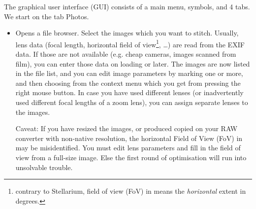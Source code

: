 The graphical user interface (GUI) consists of a main menu, symbols, and 4 tabs. We start on the tab Photos.
\begin{itemize}
\item {} Opens a file browser. Select the images which you
  want to stitch. Usually, lens data (focal length, horizontal field of view\footnote{%
    contrary to Stellarium, field of view (FoV) in  means the \emph{horizontal} extent in degrees.},
  \ldots) are read from the EXIF data. If those are not available
  (e.g. cheap cameras, images scanned from film), you can enter those
  data on loading or later.  The images are now listed in the file
  list, and you can edit image parameters by marking one or more, and
  then choosing from the context menu which you get from pressing the
  right mouse button. In case you have used different lenses (or
  inadvertently used different focal lengths of a zoom lens), you can
  assign separate lenses to the images.

  Caveat: If you have resized the images, or produced copied on your
  RAW converter with non-native resolution, the horizontal Field of View (FoV) in
   may be misidentified. You must edit lens parameters and fill
  in the field of view from a full-size image. Else the first round of
  optimisation will run into unsolvable trouble.


\end{itemize}
